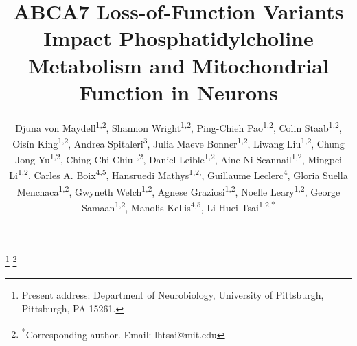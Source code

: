 \title{ABCA7 Loss-of-Function Variants Impact Phosphatidylcholine Metabolism and Mitochondrial Function in Neurons}

\author{%
  \parbox{\textwidth}{%
    Djuna von Maydell\textsuperscript{1,2}, 
    Shannon Wright\textsuperscript{1,2}, 
    Ping-Chieh Pao\textsuperscript{1,2}, 
    Colin Staab\textsuperscript{1,2}, 
    Ois\'{i}n King\textsuperscript{1,2}, 
    Andrea Spitaleri\textsuperscript{3}, 
    Julia Maeve Bonner\textsuperscript{1,2}, 
    Liwang Liu\textsuperscript{1,2}, 
    Chung Jong Yu\textsuperscript{1,2}, 
    Ching-Chi Chiu\textsuperscript{1,2}, 
    Daniel Leible\textsuperscript{1,2}, 
    Aine Ni Scannail\textsuperscript{1,2}, 
    Mingpei Li\textsuperscript{1,2}, 
    Carles A. Boix\textsuperscript{4,5}, 
    Hansruedi Mathys\textsuperscript{1,2,\textdaggerdbl}, 
    Guillaume Leclerc\textsuperscript{4}, 
    Gloria Suella Menchaca\textsuperscript{1,2}, 
    Gwyneth Welch\textsuperscript{1,2}, 
    Agnese Graziosi\textsuperscript{1,2}, 
    Noelle Leary\textsuperscript{1,2}, 
    George Samaan\textsuperscript{1,2}, 
    Manolis Kellis\textsuperscript{4,5}, 
    Li-Huei Tsai\textsuperscript{1,2,*}
  }%
}

\date{}
\maketitle


\thanks{\textsuperscript{\textdaggerdbl}Present address: Department of Neurobiology, University of Pittsburgh, Pittsburgh, PA 15261.}
\thanks{\textsuperscript{*}Corresponding author. Email: lhtsai@mit.edu}



